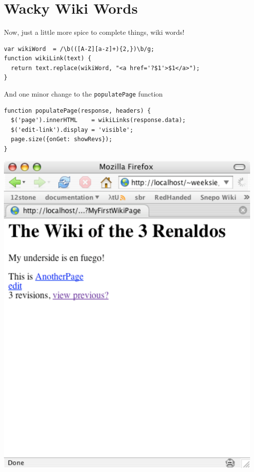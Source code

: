 \documentclass{report}
\begin{document}
\section{Wacky Wiki Words}

\paragraph{}
Now, just a little more spice to complete things, wiki words! 


\begin{Verbatim}[frame=single]
var wikiWord  = /\b(([A-Z][a-z]+){2,})\b/g;
function wikiLink(text) {
  return text.replace(wikiWord, "<a href='?$1'>$1</a>");
}
\end{Verbatim}

And one minor change to the \texttt{populatePage} function

\begin{Verbatim}[frame=single]
function populatePage(response, headers) {
  $('page').innerHTML    = wikiLinks(response.data); 
  $('edit-link').display = 'visible';
  page.size({onGet: showRevs});
}
\end{Verbatim}

\begin{center}
\includegraphics[scale=0.70]{wiki-tutorial-images/wiki-screenshot-3.pdf}
\end{center}
\end{document}
